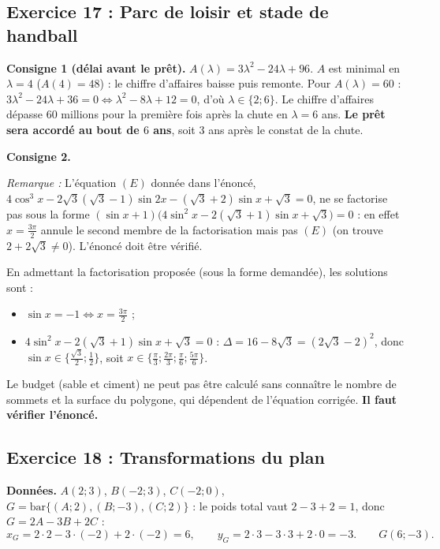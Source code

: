 \documentclass[11pt,a4paper]{article}
\newenvironment{rem}{\par\medskip\noindent\textit{Remarque :}\quad}{\par\medskip}
\begin{document}
\subsection{Exercice 17 : Parc de loisir et stade de handball}

\textbf{Consigne 1 (d\'elai avant le pr\^et).} $A(\lambda)=3\lambda^2-24\lambda+96$.
$A$ est minimal en $\lambda=4$ ($A(4)=48$) : le chiffre d'affaires baisse puis remonte.
Pour $A(\lambda)=60$ : $3\lambda^2-24\lambda+36=0\iff\lambda^2-8\lambda+12=0$, d'o\`u $\lambda\in\{2;6\}$.
Le chiffre d'affaires d\'epasse $60$ millions pour la premi\`ere fois apr\`es la chute en $\lambda=6$ ans.
\textbf{Le pr\^et sera accord\'e au bout de $6$ ans}, soit $3$ ans apr\`es le constat de la chute.

\medskip\noindent\textbf{Consigne 2.}
\begin{rem} L'\'equation $(E)$ donn\'ee dans l'\'enonc\'e,
$4\cos^3x-2\sqrt3(\sqrt3-1)\sin2x-(\sqrt3+2)\sin x+\sqrt3=0$, ne se factorise pas sous la forme
$(\sin x+1)\bigl(4\sin^2x-2(\sqrt3+1)\sin x+\sqrt3\bigr)=0$ : en effet $x=\frac{3\pi}{2}$ annule le second membre
de la factorisation mais pas $(E)$ (on trouve $2+2\sqrt3\neq0$). L'\'enonc\'e doit \^etre v\'erifi\'e.
\end{rem}
En admettant la factorisation propos\'ee (sous la forme demand\'ee), les solutions sont :
\begin{itemize}
  \item $\sin x=-1\iff x=\frac{3\pi}{2}$ ;
  \item $4\sin^2x-2(\sqrt3+1)\sin x+\sqrt3=0$ : $\Delta=16-8\sqrt3=(2\sqrt3-2)^2$, donc $\sin x\in\{\frac{\sqrt3}{2};\frac12\}$,
  soit $x\in\{\frac{\pi}{3};\frac{2\pi}{3};\frac{\pi}{6};\frac{5\pi}{6}\}$.
\end{itemize}
Le budget (sable et ciment) ne peut pas \^etre calcul\'e sans conna\^itre le nombre de sommets et la surface du polygone,
qui d\'ependent de l'\'equation corrig\'ee. \textbf{Il faut v\'erifier l'\'enonc\'e.}

\subsection{Exercice 18 : Transformations du plan}

\textbf{Donn\'ees.} $A(2;3)$, $B(-2;3)$, $C(-2;0)$, $G=\mathrm{bar}\{(A;2),(B;-3),(C;2)\}$ :
le poids total vaut $2-3+2=1$, donc $G=2A-3B+2C$ :
\[
x_G=2\cdot2-3\cdot(-2)+2\cdot(-2)=6,\qquad y_G=2\cdot3-3\cdot3+2\cdot0=-3.\qquad G(6;-3).
\]
\end{document}
